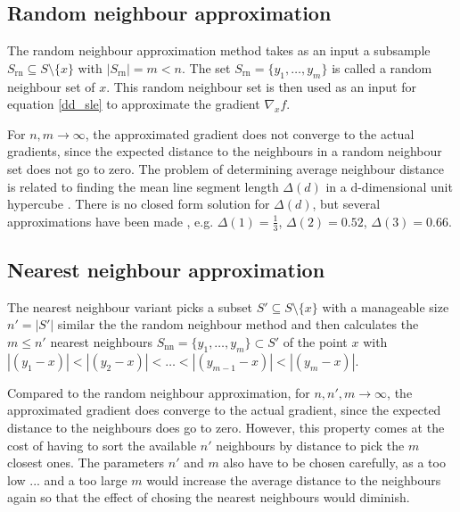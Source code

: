 \documentclass[
  a4paper,  %
  twoside,  %
  bibliography=totoc,
  headsepline,
  cleardoublepage=empty,
  parskip=half,
  draft=false
]{scrbook}
\begin{document}
\subsection{Random neighbour approximation}

The random neighbour approximation method takes as an input a subsample $S_{\text{rn}} \subseteq S \setminus \{x\}$ with $|S_{\text{rn}}|=m < n$.
The set $S_{\text{rn}}=\{y_1, \dots, y_{m}\}$ is called a random neighbour set of $x$.
This random neighbour set is then used as an input for equation \ref{dd_sle} to approximate the gradient $\nabla_x f$.

For $n,m \to \infty$, the approximated gradient does not converge to the actual gradients, since the expected distance to the neighbours in a random neighbour set does not go to zero.
The problem of determining average neighbour distance is related to finding the mean line segment length $\Delta (d)$ in a d-dimensional unit hypercube \cite{}.
There is no closed form solution for $\Delta (d)$, but several approximations have been made \cite{}, e.g. $\Delta (1)=\frac{1}{3}$, $\Delta (2)=0.52$, $\Delta (3)=0.66$.

\subsection{Nearest neighbour approximation}

The nearest neighbour variant picks a subset $S' \subseteq S \setminus \{x\}$ with a manageable size $n'=|S'|$ similar the the random neighbour method and then calculates the $m \leq n'$ nearest neighbours $S_{\text{nn}}=\{y_1,\dots,y_m\} \subset S'$ of the point $x$ with $|(y_1-x)| < |(y_2-x)|< \dots<|(y_{m-1}-x)| < |(y_{m}-x)|$.

Compared to the random neighbour approximation, for $n,n',m \to \infty$, the approximated gradient does converge to the actual gradient, since the expected distance to the neighbours does go to zero.
However, this property comes at the cost of having to sort the available $n'$ neighbours by distance to pick the $m$ closest ones.
The parameters $n'$ and $m$ also have to be chosen carefully, as a too low ... and a too large $m$ would increase the average distance to the neighbours again so that the effect of chosing the nearest neighbours would diminish.
\end{document}
